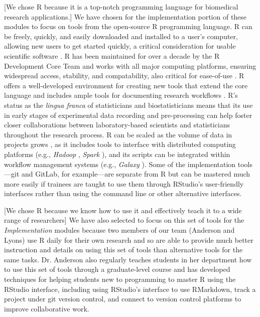 \documentclass[pdftex,english,11pt,parskip=half]{scrartcl}
\begin{document}
[We chose R because it is a top-notch programming language for biomedical research applications.] We have chosen for the implementation portion of these modules to focus on tools from the open-source R programming language. R can be freely, quickly, and easily downloaded and installed to a user's computer, allowing new users to get started quickly, a critical consideration for usable scientific software \cite{list2017ten}. R has been maintained for over a decade by the R Development Core Team and works with all major computing platforms, ensuring  widespread access, stability, and compatability, also critical for ease-of-use \cite{baumer2017lessons, altschul2013anatomy}. R offers a well-developed environment for creating new tools that extend the core language \cite{wickham2015r} and includes ample tools for documenting research workflows \cite{xie2015dynamic, xie2016bookdown}. R's status as the \textit{lingua franca} of statisticians and biostatisticians means that its use in early stages of experimental data recording and pre-processing can help foster closer collaborations between laboratory-based scientists and statisticians throughout the research process. R can be scaled as the volume of data in projects grows \cite{list2017ten}, as it includes tools to interface with distributed computing platforms (e.g., \textit{Hadoop} \cite{pathak2014rhadoop}, \textit{Spark} \cite{sparklyr}), and its scripts can be integrated within workflow management systems (e.g., \textit{Galaxy} \cite{goecks2010galaxy, walker2016models}). Some of the implementation tools---git and GitLab, for example---are separate from R but can be mastered much more easily if trainees are taught to use them through RStudio's user-friendly interfaces rather than using the command line or other alternative interfaces.

[We chose R because we know how to use it and effectively teach it to a wide range of researchers] We have also selected to focus on this set of tools for the \textit{Implementation} modules because two members of our team (Anderson and Lyons) use R daily for their own research and so are able to provide much better instruction and details on using this set of tools than alternative tools for the same tasks. Dr. Anderson also regularly teaches students in her department how to use this set of tools through a graduate-level course and has developed techniques for helping students new to programming to master R using the RStudio interface, including using RStudio's interface to use RMarkdown, track a project under git version control, and connect to version control platforms to improve collaborative work. 
\end{document}
